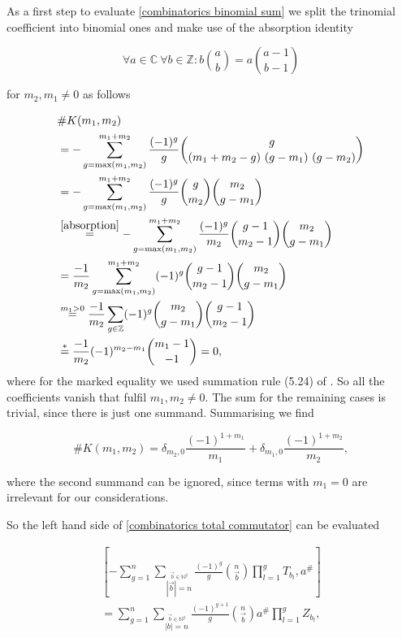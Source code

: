 \documentclass[b5paper,draft,openbib,12pt]{memoir}
\begin{document}
As a first step to evaluate \eqref{combinatorics binomial sum} we split the trinomial coefficient into binomial
ones and make use of the absorption identity

\begin{equation}\tag{absorption}\label{absorption}
\forall a \in \mathbb{C}\ \forall b \in \mathbb{Z}: b \binom{a}{b} = a \binom{a-1}{b-1} 
\end{equation}

for \(m_2,m_1\neq 0\) as follows

\begin{align*}
&\#K(m_1,m_2) \\
&=-\sum_{g=\max(m_1,m_2)}^{m_1+m_2} \frac{(-1)^g}{g} \binom{g}{(m_1+m_2-g) \ (g-m_1) \ (g - m_2)}\\
&=-\sum_{g=\max(m_1,m_2)}^{m_1+m_2} \frac{(-1)^g}{g} \binom{g}{m_2}\binom{m_2}{g-m_1}\\
&\stackrel{\eqref{absorption}}{=}-\sum_{g=\max(m_1,m_2)}^{m_1+m_2} \frac{(-1)^g}{m_2} \binom{g-1}{m_2-1}\binom{m_2}{g-m_1}\\
&=\frac{-1}{m_2} \sum_{g=\max(m_1,m_2)}^{m_1+m_2} (-1)^g \binom{g-1}{m_2-1}\binom{m_2}{g-m_1}\\
&\overset{m_1>0}{=}\frac{-1}{m_2} \sum_{g\in\mathbb{Z}} (-1)^g \binom{m_2}{g-m_1}\binom{g-1}{m_2-1}\\
&\stackrel{*}{=} \frac{-1}{m_2} (-1)^{m_2-m_1} \binom{m_1-1}{-1} = 0,
\end{align*}
where for the marked equality we used summation rule (5.24) of \cite{graham1994concrete}. 
So all the coefficients vanish that fulfil \(m_1,m_2\neq 0\). The sum for the remaining cases
is trivial, since there is just one summand. Summarising we find

\begin{equation*}
\#K(m_1,m_2)= \delta_{m_2,0} \frac{(-1)^{1+m_1}}{m_1} + \delta_{m_1,0} \frac{(-1)^{1+m_2}}{m_2},
\end{equation*}

where the second summand can be ignored, since terms with \(m_1=0\) are irrelevant for our considerations.

 So the left hand side of 
\eqref{combinatorics total commutator} can be evaluated

\begin{align*}
\left[-\sum_{g=1}^n \sum_{\stackrel{\vec{b}\in\mathbb{N}^g}{|\vec{b}|=n}}\frac{(-1)^g}{g} 
\binom{n}{\vec{b}} \prod_{l=1}^g T_{b_l}, a^\#\right]\\
= \sum_{g=1}^n \sum_{\stackrel{\vec{b}\in\mathbb{N}^g}{|b|=n}} \frac{(-1)^{g+1}}{g} \binom{n}{\vec{b}}  a^\# \prod_{l=1}^g Z_{b_l},
\end{align*}
\end{document}
